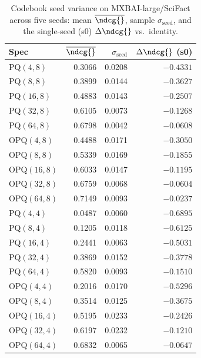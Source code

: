 \begin{table}[t]
\centering
\small
\caption{Codebook seed variance on MXBAI-large/SciFact across five seeds: mean $\overline{\ndcg{}}$, sample $\sigma_{\text{seed}}$, and the single-seed (s0) $\Delta\ndcg{}$ vs.\ identity.}
\label{tab:seed-variance-mxbai-large-scifact}
\begin{tabular}{lrrr}
\toprule
Spec & $\overline{\ndcg{}}$ & $\sigma_{\text{seed}}$ & $\Delta\ndcg{}$ (s0) \\
\midrule
PQ$(4,8)$ & 0.3066 & 0.0208 & $-0.4331$ \\
PQ$(8,8)$ & 0.3899 & 0.0144 & $-0.3627$ \\
PQ$(16,8)$ & 0.4883 & 0.0143 & $-0.2507$ \\
PQ$(32,8)$ & 0.6105 & 0.0073 & $-0.1268$ \\
PQ$(64,8)$ & 0.6798 & 0.0042 & $-0.0608$ \\
OPQ$(4,8)$ & 0.4488 & 0.0171 & $-0.3050$ \\
OPQ$(8,8)$ & 0.5339 & 0.0169 & $-0.1855$ \\
OPQ$(16,8)$ & 0.6033 & 0.0147 & $-0.1195$ \\
OPQ$(32,8)$ & 0.6759 & 0.0068 & $-0.0604$ \\
OPQ$(64,8)$ & 0.7149 & 0.0093 & $-0.0237$ \\
PQ$(4,4)$ & 0.0487 & 0.0060 & $-0.6895$ \\
PQ$(8,4)$ & 0.1205 & 0.0118 & $-0.6125$ \\
PQ$(16,4)$ & 0.2441 & 0.0063 & $-0.5031$ \\
PQ$(32,4)$ & 0.3869 & 0.0152 & $-0.3778$ \\
PQ$(64,4)$ & 0.5820 & 0.0093 & $-0.1510$ \\
OPQ$(4,4)$ & 0.2016 & 0.0170 & $-0.5296$ \\
OPQ$(8,4)$ & 0.3514 & 0.0125 & $-0.3675$ \\
OPQ$(16,4)$ & 0.5195 & 0.0233 & $-0.2426$ \\
OPQ$(32,4)$ & 0.6197 & 0.0232 & $-0.1210$ \\
OPQ$(64,4)$ & 0.6832 & 0.0065 & $-0.0647$ \\
\bottomrule
\end{tabular}
\end{table}
